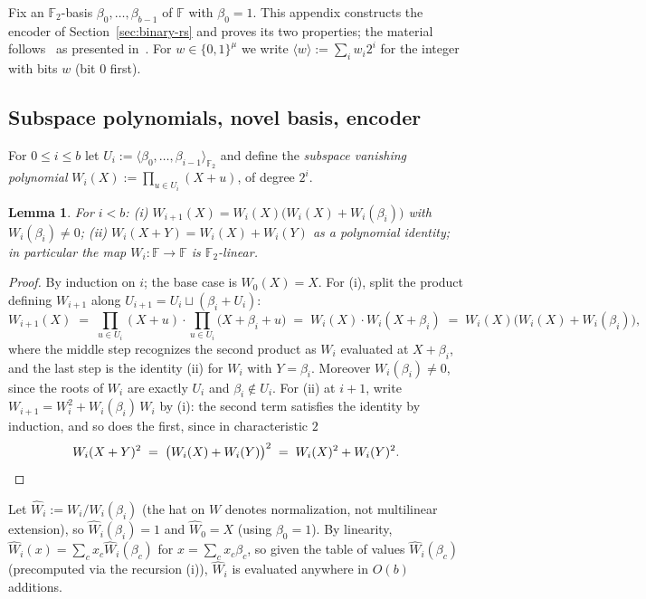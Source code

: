 \documentclass[11pt]{article}
\newcommand{\F}{\mathbb{F}}
\newcommand{\Ftwo}{\mathbb{F}_2}
\newcommand{\cube}[1]{\{0,1\}^{#1}}
\newcommand{\Wn}[1]{\widehat{W}_{#1}}   %
\theoremstyle{plain}
\newtheorem{lemma}[theorem]{Lemma}
\theoremstyle{definition}
\theoremstyle{remark}
\begin{document}
Fix an $\Ftwo$-basis $\beta_0, \dots, \beta_{b-1}$ of $\F$ with $\beta_0 = 1$. This appendix constructs the encoder of Section~\ref{sec:binary-rs} and proves its two properties; the material follows~\cite{LCH14} as presented in~\cite{DP26}. For $w \in \cube{\mu}$ we write $\langle w \rangle := \sum_i w_i 2^i$ for the integer with bits $w$ (bit $0$ first).

\subsection{Subspace polynomials, novel basis, encoder}

For $0 \le i \le b$ let $U_i := \langle \beta_0, \dots, \beta_{i-1} \rangle_{\Ftwo}$ and define the \emph{subspace vanishing polynomial} $W_i(X) := \prod_{u \in U_i}(X + u)$, of degree $2^i$.

\begin{lemma}\label{lem:subspace}
For $i < b$: (i) $W_{i+1}(X) = W_i(X)\bigl(W_i(X) + W_i(\beta_i)\bigr)$ with $W_i(\beta_i) \neq 0$; (ii) $W_i(X + Y) = W_i(X) + W_i(Y)$ as a polynomial identity; in particular the map $W_i : \F \to \F$ is $\Ftwo$-linear.
\end{lemma}

\begin{proof}
By induction on $i$; the base case is $W_0(X) = X$. For (i), split the product defining $W_{i+1}$ along $U_{i+1} = U_i \sqcup (\beta_i + U_i)$:
\[
W_{i+1}(X) \;=\; \prod_{u \in U_i} (X + u) \cdot \prod_{u \in U_i} \bigl(X + \beta_i + u\bigr) \;=\; W_i(X) \cdot W_i(X + \beta_i) \;=\; W_i(X) \bigl( W_i(X) + W_i(\beta_i) \bigr),
\]
where the middle step recognizes the second product as $W_i$ evaluated at $X + \beta_i$, and the last step is the identity (ii) for $W_i$ with $Y = \beta_i$. Moreover $W_i(\beta_i) \neq 0$, since the roots of $W_i$ are exactly $U_i$ and $\beta_i \notin U_i$. For (ii) at $i + 1$, write $W_{i+1} = W_i^2 + W_i(\beta_i)\, W_i$ by (i): the second term satisfies the identity by induction, and so does the first, since in characteristic $2$
\[
W_i(X+Y)^2 \;=\; \bigl(W_i(X) + W_i(Y)\bigr)^2 \;=\; W_i(X)^2 + W_i(Y)^2 . \qedhere
\]
\end{proof}

Let $\Wn{i} := W_i / W_i(\beta_i)$ (the hat on $W$ denotes normalization, not multilinear extension), so $\Wn{i}(\beta_i) = 1$ and $\Wn{0} = X$ (using $\beta_0 = 1$). By linearity, $\Wn{i}(x) = \sum_c x_c \Wn{i}(\beta_c)$ for $x = \sum_c x_c \beta_c$, so given the table of values $\Wn{i}(\beta_c)$ (precomputed via the recursion (i)), $\Wn{i}$ is evaluated anywhere in $O(b)$ additions.
\end{document}
